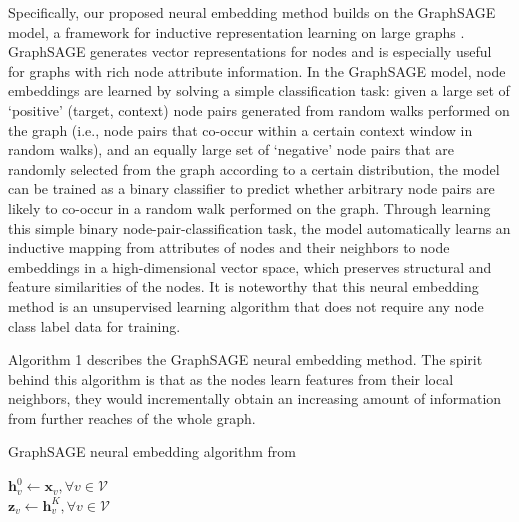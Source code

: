 \documentclass{article}
\begin{document}
Specifically, our proposed neural embedding method builds on the GraphSAGE model, a framework for inductive representation learning on large graphs \cite{hamilton2017inductive}. GraphSAGE generates vector representations for nodes and is especially useful for graphs with rich node attribute information. In the GraphSAGE model, node embeddings are learned by solving a simple classification task: given a large set of ‘positive’ (target, context) node pairs generated from random walks performed on the graph (i.e., node pairs that co-occur within a certain context window in random walks), and an equally large set of ‘negative’ node pairs that are randomly selected from the graph according to a certain distribution, the model can be trained as a binary classifier to predict whether arbitrary node pairs are likely to co-occur in a random walk performed on the graph. Through learning this simple binary node-pair-classification task, the model automatically learns an inductive mapping from attributes of nodes and their neighbors to node embeddings in a high-dimensional vector space, which preserves structural and feature similarities of the nodes. It is noteworthy that this neural embedding method is an unsupervised learning algorithm that does not require any node class label data for training.

Algorithm 1 describes the GraphSAGE neural embedding method. The spirit behind this algorithm is that as the nodes learn features from their local neighbors, they would incrementally obtain an increasing amount of information from further reaches of the whole graph.

\begin{algorithm}[H]
    \caption{GraphSAGE neural embedding algorithm from \cite{hamilton2017inductive}}
    \label{alg:algorithm1}
    
    \BlankLine

    $\textbf{h}^0_v \leftarrow \textbf{x}_v, \forall v \in \mathcal{V}$ \\
     $\textbf{z}_v\leftarrow \textbf{h}^{K}_v, \forall v \in \mathcal{V}$ 

\end{algorithm}
\end{document}
